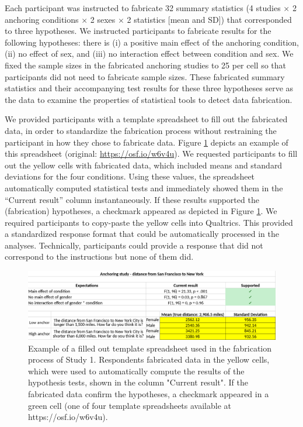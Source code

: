 \documentclass[a5paper]{book}
\begin{document}
Each participant was instructed to fabricate 32 summary statistics (4
studies \(\times\) 2 anchoring conditions \(\times\) 2 sexes \(\times\)
2 statistics {[}mean and SD{]}) that corresponded to three hypotheses.
We instructed participants to fabricate results for the following
hypotheses: there is (i) a positive main effect of the anchoring
condition, (ii) no effect of sex, and (iii) no interaction effect
between condition and sex. We fixed the sample sizes in the fabricated
anchoring studies to 25 per cell so that participants did not need to
fabricate sample sizes. These fabricated summary statistics and their
accompanying test results for these three hypotheses serve as the data
to examine the properties of statistical tools to detect data
fabrication.

We provided participants with a template spreadsheet to fill out the
fabricated data, in order to standardize the fabrication process without
restraining the participant in how they chose to fabricate data. Figure
\ref{fig:spreadsheet-study1} depicts an example of this spreadsheet
(original: \url{https://osf.io/w6v4u}). We requested participants to
fill out the yellow cells with fabricated data, which included means and
standard deviations for the four conditions. Using these values, the
spreadsheet automatically computed statistical tests and immediately
showed them in the \enquote{Current result} column instantaneously. If
these results supported the (fabrication) hypotheses, a checkmark
appeared as depicted in Figure \ref{fig:spreadsheet-study1}. We required
participants to copy-paste the yellow cells into Qualtrics. This
provided a standardized response format that could be automatically
processed in the analyses. Technically, participants could provide a
response that did not correspond to the instructions but none of them
did.

\begin{figure}

{\centering \includegraphics[width=1\linewidth]{./assets/figures/spreadsheet} 

}

\caption{Example of a filled out template spreadsheet used in the fabrication process of Study 1. Respondents fabricated data in the yellow cells, which were used to automatically compute the results of the hypothesis tests, shown in the column "Current result". If the fabricated data confirm the hypotheses, a checkmark appeared in a green cell (one of four template spreadsheets available at https://osf.io/w6v4u).}\label{fig:spreadsheet-study1}
\end{figure}
\end{document}
